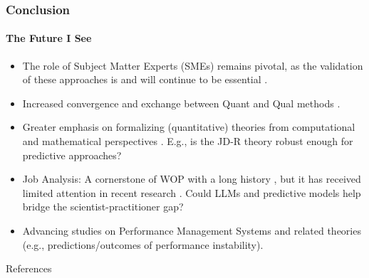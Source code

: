 \documentclass{beamer}
\begin{document}
\begin{frame}
	\frametitle{Conclusion}
	\framesubtitle{The Future I See}
	{\small
		\begin{itemize}
			\item<1> The role of Subject Matter Experts (SMEs) remains pivotal, as the validation of these approaches is and will continue to be essential {\scriptsize \parencite{woo2024}}.
			\item<2> Increased convergence and exchange between Quant and Qual methods {\scriptsize \parencite[see][]{bliese2024_AOM}}.
			\item<3> Greater emphasis on formalizing (quantitative) theories from computational and mathematical perspectives {\scriptsize \parencite{bliese2024_AOM, grand_inPressORM, vanDongen_inPress_PsychReview}}. E.g., is the JD-R theory robust enough for predictive approaches?
			\item<4> Job Analysis: A cornerstone of WOP with a long history {\scriptsize \parencite{viteles1922}}, but it has received limited attention in recent research {\scriptsize \parencite{li2024jobAnalysis, putka2023evaluating}}. Could LLMs and predictive models help bridge the scientist-practitioner gap?
			\item<5> Advancing studies on Performance Management Systems and related theories (e.g., predictions/outcomes of performance instability).
		\end{itemize}
	}
\end{frame}



\begin{frame}[allowframebreaks]{References}
    \printbibliography
\end{frame}




\end{document}
